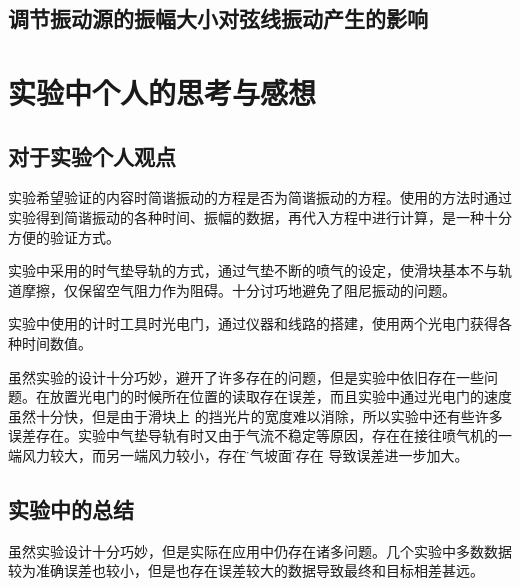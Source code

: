 \documentclass{ctexart}
\begin{document}
  \subsection{调节振动源的振幅大小对弦线振动产生的影响}
\newpage

\section{实验中个人的思考与感想}
  \subsection{对于实验个人观点}
  实验希望验证的内容时简谐振动的方程是否为简谐振动的方程。使用的方法时通过实验得到简谐振动的各种时间、振幅的数据，再代入方程中进行计算，是一种十分方便的验证方式。

  实验中采用的时气垫导轨的方式，通过气垫不断的喷气的设定，使滑块基本不与轨道摩擦，仅保留空气阻力作为阻碍。十分讨巧地避免了阻尼振动的问题。

  实验中使用的计时工具时光电门，通过仪器和线路的搭建，使用两个光电门获得各种时间数值。

  虽然实验的设计十分巧妙，避开了许多存在的问题，但是实验中依旧存在一些问题。在放置光电门的时候所在位置的读取存在误差，而且实验中通过光电门的速度虽然十分快，但是由于滑块上
  的挡光片的宽度难以消除，所以实验中还有些许多误差存在。实验中气垫导轨有时又由于气流不稳定等原因，存在在接往喷气机的一端风力较大，而另一端风力较小，存在\" 空气坡面\"的存在
  导致误差进一步加大。
  
  \subsection{实验中的总结}
  虽然实验设计十分巧妙，但是实际在应用中仍存在诸多问题。几个实验中多数数据较为准确误差也较小，但是也存在误差较大的数据导致最终和目标相差甚远。
\end{document}
